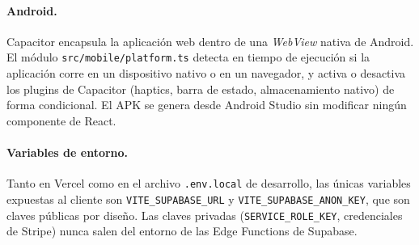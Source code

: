 \paragraph{Android.}
Capacitor encapsula la aplicación web dentro de una \textit{WebView} nativa de Android. El módulo \texttt{src/mobile/platform.ts} detecta en tiempo de ejecución si la aplicación corre en un dispositivo nativo o en un navegador, y activa o desactiva los plugins de Capacitor (haptics, barra de estado, almacenamiento nativo) de forma condicional. El APK se genera desde Android Studio sin modificar ningún componente de React.

\paragraph{Variables de entorno.}
Tanto en Vercel como en el archivo \texttt{.env.local} de desarrollo, las únicas variables expuestas al cliente son \texttt{VITE\_SUPABASE\_URL} y \texttt{VITE\_SUPABASE\_ANON\_KEY}, que son claves públicas por diseño. Las claves privadas (\texttt{SERVICE\_ROLE\_KEY}, credenciales de Stripe) nunca salen del entorno de las Edge Functions de Supabase.
